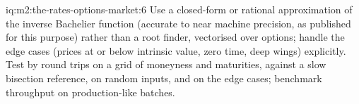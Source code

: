 \begin{solution}{iq:m2:the-rates-options-market:6}
Use a closed-form or rational approximation of the inverse Bachelier function
(accurate to near machine precision, as published for this purpose) rather
than a root finder, vectorised over options; handle the edge cases (prices at
or below intrinsic value, zero time, deep wings) explicitly. Test by round trips
on a grid of moneyness and maturities, against a slow bisection reference, on
random inputs, and on the edge cases; benchmark throughput on production-like
batches.
\end{solution}

